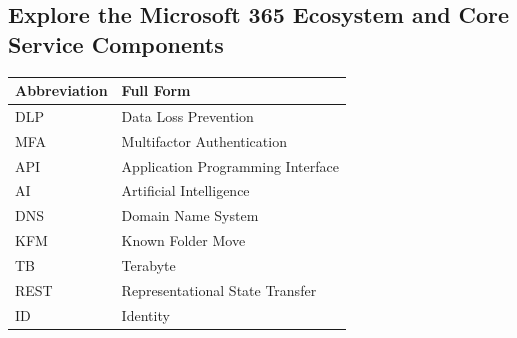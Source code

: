 \documentclass[10pt]{article}
\begin{document}
\subsection{Explore the Microsoft 365 Ecosystem and Core Service Components}

\begin{center}
\begin{tabular}{>{\raggedright\arraybackslash}p{} >{\raggedright\arraybackslash}p{}}
\toprule
\textbf{Abbreviation} & \textbf{Full Form} \\
\midrule
DLP & Data Loss Prevention \\
MFA & Multifactor Authentication \\
API & Application Programming Interface \\
AI & Artificial Intelligence \\
DNS & Domain Name System \\
KFM & Known Folder Move \\
TB & Terabyte \\
REST & Representational State Transfer \\
ID & Identity \\
\bottomrule
\end{tabular}
\end{center}
\end{document}
